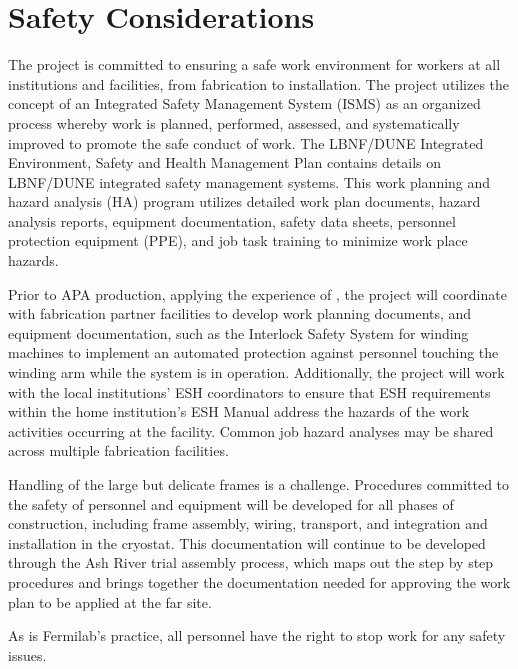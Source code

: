 \section{Safety Considerations}
\label{sec:fdsp-apa-safety}


The project is committed to ensuring a safe work environment for workers at all institutions and facilities, from  fabrication to installation. The project utilizes the concept of an Integrated Safety Management System (ISMS) as an organized process whereby work is planned, performed, assessed, and systematically improved to promote the safe conduct of work. The LBNF/DUNE Integrated Environment, Safety and Health Management Plan \cite{bib:docdb291} %
contains details on LBNF/DUNE integrated safety management systems. This work planning and hazard analysis (HA) program utilizes detailed work plan documents, hazard analysis reports, equipment documentation, safety data sheets, personnel protection equipment (PPE), and job task training to minimize work place hazards. 

Prior to APA production, applying the experience of , the project will coordinate with fabrication partner facilities to develop work planning documents, and equipment documentation, such as the Interlock Safety System for  winding machines to implement an automated protection against personnel touching the winding arm while the system is in operation. Additionally, the project will work with the local institutions' ESH coordinators to ensure that ESH requirements within the home institution's ESH Manual address the hazards of the work activities occurring at the facility. Common job hazard analyses may be shared across multiple fabrication facilities.   

Handling of the large but delicate frames is a challenge. Procedures committed to the safety of personnel and equipment will be developed for all phases of construction, including frame assembly, wiring, transport, and integration and installation in the cryostat. This documentation will continue to be developed through the Ash River trial assembly process, which maps out the step by step procedures and brings together the documentation needed for approving the work plan to be applied at the far site. 

As is Fermilab's practice, all personnel have the right to stop work for any safety issues.
